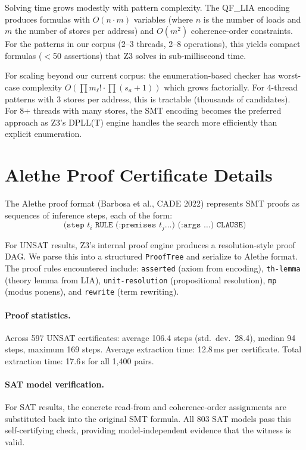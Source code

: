 \documentclass[11pt]{article}
\begin{document}
\noindent
Solving time grows modestly with pattern complexity.  The QF\_LIA
encoding produces formulas with $O(n \cdot m)$ variables (where
$n$ is the number of loads and $m$ the number of stores per address)
and $O(m^2)$ coherence-order constraints.  For the patterns in our
corpus (2--3 threads, 2--8 operations), this yields compact formulas
($<$50 assertions) that Z3 solves in sub-millisecond time.

For scaling beyond our current corpus: the enumeration-based checker
has worst-case complexity $O(\prod m_\ell! \cdot \prod (s_a+1))$
which grows factorially.  For 4-thread patterns with 3 stores per
address, this is tractable (thousands of candidates).  For 8+ threads
with many stores, the SMT encoding becomes the preferred approach
as Z3's DPLL(T) engine handles the search more efficiently than
explicit enumeration.

\section{Alethe Proof Certificate Details}
\label{app:alethe-details}

The Alethe proof format (Barbosa et al., CADE 2022) represents
SMT proofs as sequences of inference steps, each of the form:
\[
\texttt{(step } t_i \texttt{ RULE (:premises } t_j \ldots \texttt{) (:args \ldots) CLAUSE)}
\]

For UNSAT results, Z3's internal proof engine produces a resolution-style
proof DAG.  We parse this into a structured \texttt{ProofTree} and serialize
to Alethe format.  The proof rules encountered include:
\texttt{asserted} (axiom from encoding), \texttt{th-lemma} (theory lemma
from LIA), \texttt{unit-resolution} (propositional resolution),
\texttt{mp} (modus ponens), and \texttt{rewrite} (term rewriting).

\paragraph{Proof statistics.}
Across 597 UNSAT certificates:
average 106.4 steps (std.\ dev.\ 28.4),
median 94 steps, maximum 169 steps.
Average extraction time: 12.8\,ms per certificate.
Total extraction time: 17.6\,s for all 1{,}400 pairs.

\paragraph{SAT model verification.}
For SAT results, the concrete read-from and coherence-order assignments
are substituted back into the original SMT formula.  All 803 SAT models
pass this self-certifying check, providing model-independent evidence
that the witness is valid.
\end{document}
